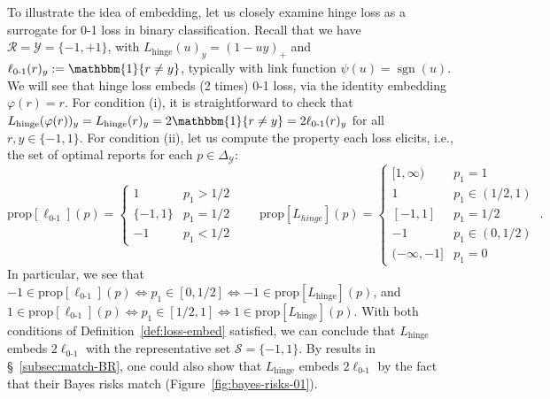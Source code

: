 \documentclass[11pt]{article}
\newcommand{\prop}[1]{\mathrm{prop}[#1]}
\newcommand{\simplex}{\Delta_\Y}
\newcommand{\R}{\mathcal{R}}
\newcommand{\Sc}{\mathcal{S}}
\newcommand{\Y}{\mathcal{Y}}
\newcommand{\ones}{\mathbbm{1}}
\newcommand{\Ind}[1]{\ones\{#1\}}
\newcommand{\hinge}{L_{\mathrm{hinge}}}
\newcommand{\ellzo}{\ell_{\text{0-1}}}
\DeclareMathOperator*{\sgn}{sgn}
\begin{document}
To illustrate the idea of embedding, let us closely examine hinge loss as a surrogate for 0-1 loss in binary classification.
Recall that we have $\R = \Y = \{-1, +1\}$, with $\hinge(u)_y = (1 - uy)_+$ and $\ellzo(r)_y := \Ind{r\neq y}$, typically with link function $\psi(u) = \sgn(u)$.
We will see that hinge loss embeds (2 times) 0-1 loss, via the identity embedding $\varphi(r) = r$.
For condition (i), it is straightforward to check that $\hinge(\varphi(r))_y = \hinge(r)_y = 2 \Ind{r \neq y} = 2\ellzo(r)_y$ for all $r,y\in\{-1,1\}$.
For condition (ii), let us compute the property each loss elicits, i.e., the set of optimal reports for each $p\in\simplex$:
\[
\prop{\ellzo}(p) = \begin{cases}
1 & p_1 > 1/2 \\
\{-1,1\} & p_1 = 1/2\\
-1 & p_1 < 1/2
\end{cases}
\qquad
\prop{L_{hinge}}(p) = \begin{cases}
[1,\infty) & p_1 = 1\\
1 & p_1 \in (1/2,1) \\
[-1,1] & p_1 = 1/2\\
-1& p_1 \in (0, 1/2)\\
(-\infty, -1]& p_1 = 0
\end{cases}~.
\]
In particular, we see that $-1 \in \prop{\ellzo}(p) \iff p_1 \in [0, 1/2] \iff -1 \in \prop{\hinge}(p)$, and $1 \in \prop{\ellzo}(p) \iff p_1 \in [1/2,1] \iff 1 \in \prop{\hinge}(p)$.
With both conditions of Definition~\ref{def:loss-embed} satisfied, we can conclude that $\hinge$ embeds $2\ellzo$ with the representative set $\Sc = \{-1,1\}$.
By results in \S~\ref{subsec:match-BR}, one could also show that $\hinge$ embeds $2\ellzo$ by the fact that their Bayes risks match (Figure~\ref{fig:bayes-risks-01}).
\end{document}
